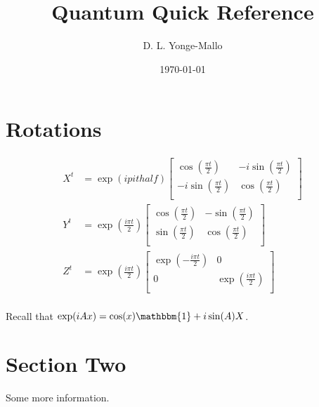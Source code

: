 \documentclass[a4paper,landscape,columns=3]{CheatSheet}
\title{Quantum Quick Reference}
\author{D. L. Yonge-Mallo}
\date{\today}
\begin{document}
\newcommand{\pithalf}{\ensuremath{\frac{\pi t}{2}}}
\newcommand{\ipithalf}{\ensuremath{\frac{i\pi t}{2}}}
\newcommand{\one}{\ensuremath{\mathbbm{1}}}

\maketitle

\section{Rotations}

\begin{align*}
X^{t} &= \exp\left(ipithalf\right)
\begin{bmatrix}
\cos\left(\pithalf\right) & -i\sin\left(\pithalf\right) \\
-i\sin\left(\pithalf\right) & \cos\left(\pithalf\right) \\
\end{bmatrix}\\
Y^{t} &= \exp\left(\ipithalf\right)
\begin{bmatrix}
\cos\left(\pithalf\right) & -\sin\left(\pithalf\right) \\
\sin\left(\pithalf\right) & \cos\left(\pithalf\right) \\
\end{bmatrix}\\
Z^{t} &= \exp\left(\ipithalf\right)
\begin{bmatrix}
\exp\left(-\ipithalf\right) & 0 \\
0 & \exp\left(\ipithalf\right) \\
\end{bmatrix}\\
\end{align*}

Recall that \(\exp(iAx) = \cos(x)\one + i\sin(A)X\).

\section{Section Two}
Some more information.
\end{document}

